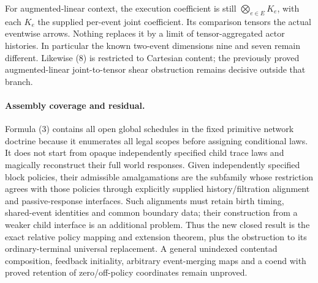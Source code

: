 \documentclass[11pt]{article}
\begin{document}
For augmented-linear context, the execution coefficient is still $\bigotimes_{e\in E}K_e$, with each $K_e$ the supplied per-event joint coefficient. Its comparison tensors the actual eventwise arrows. Nothing replaces it by a limit of tensor-aggregated actor histories. In particular the known two-event dimensions nine and seven remain different. Likewise (8) is restricted to Cartesian content; the previously proved augmented-linear joint-to-tensor shear obstruction remains decisive outside that branch.

\paragraph{Assembly coverage and residual.}
Formula (3) contains all open global schedules in the fixed primitive network doctrine because it enumerates all legal scopes before assigning conditional laws. It does not start from opaque independently specified child trace laws and magically reconstruct their full world responses. Given independently specified block policies, their admissible amalgamations are the subfamily whose restriction agrees with those policies through explicitly supplied history/filtration alignment and passive-response interfaces. Such alignments must retain birth timing, shared-event identities and common boundary data; their construction from a weaker child interface is an additional problem. Thus the new closed result is the exact relative policy mapping and extension theorem, plus the obstruction to its ordinary-terminal universal replacement. A general unindexed contentad composition, feedback initiality, arbitrary event-merging maps and a coend with proved retention of zero/off-policy coordinates remain unproved.
\end{document}
